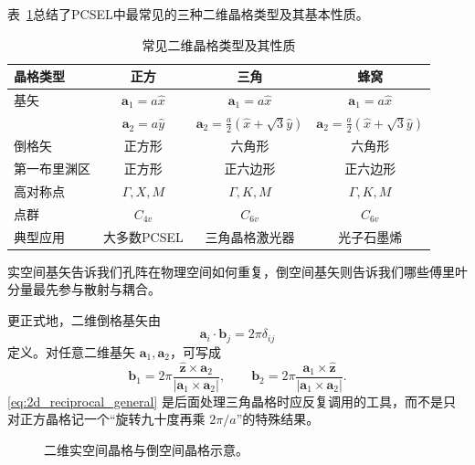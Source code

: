 表~\ref{tab:ch04_lattice_types}总结了PCSEL中最常见的三种二维晶格类型及其基本性质。
\begin{table}[htbp]
  \centering
  \caption{常见二维晶格类型及其性质}
  \label{tab:ch04_lattice_types}
  \begin{tabular}{lccc}
    \toprule
    \textbf{晶格类型} & \textbf{正方} & \textbf{三角} & \textbf{蜂窝} \\
    \midrule
    基矢 & $\bm{a}_1=a\hat{x}$ & $\bm{a}_1=a\hat{x}$ & $\bm{a}_1=a\hat{x}$ \\
         & $\bm{a}_2=a\hat{y}$ & $\bm{a}_2=\frac{a}{2}(\hat{x}+\sqrt{3}\hat{y})$ & $\bm{a}_2=\frac{a}{2}(\hat{x}+\sqrt{3}\hat{y})$ \\
    倒格矢 & 正方形 & 六角形 & 六角形 \\
    第一布里渊区 & 正方形 & 正六边形 & 正六边形 \\
    高对称点 & $\Gamma, X, M$ & $\Gamma, K, M$ & $\Gamma, K, M$ \\
    点群 & $C_{4v}$ & $C_{6v}$ & $C_{6v}$ \\
    典型应用 & 大多数PCSEL & 三角晶格激光器 & 光子石墨烯 \\
    \bottomrule
  \end{tabular}
\end{table}

实空间基矢告诉我们孔阵在物理空间如何重复，倒空间基矢则告诉我们哪些傅里叶分量最先参与散射与耦合。

更正式地，二维倒格基矢由
\begin{equation}
\bm a_i\cdot \bm b_j = 2\pi\delta_{ij}
\label{eq:reciprocal_duality}
\end{equation}
定义。对任意二维基矢 $\bm a_1,\bm a_2$，可写成
\begin{equation}
\bm b_1 =
2\pi\frac{\hat{\bm z}\times \bm a_2}{|\bm a_1\times\bm a_2|},
\qquad
\bm b_2 =
2\pi\frac{\bm a_1\times \hat{\bm z}}{|\bm a_1\times\bm a_2|}.
\label{eq:2d_reciprocal_general}
\end{equation}
\cref{eq:2d_reciprocal_general} 是后面处理三角晶格时应反复调用的工具，而不是只对正方晶格记一个“旋转九十度再乘 $2\pi/a$”的特殊结果。

\begin{figure}[htbp]
  \centering
  \caption{二维实空间晶格与倒空间晶格示意。}
  \label{fig:lattice-reciprocal}
\end{figure}


